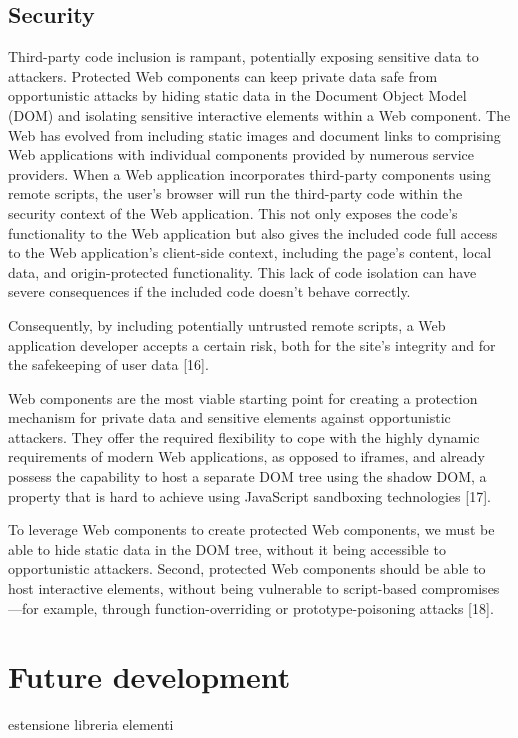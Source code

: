 \documentclass{sig-alternate}
\begin{document}
\subsection{Security}

Third-party code inclusion is rampant, potentially exposing sensitive data to attackers. Protected Web components can keep private data safe from opportunistic attacks by hiding static data in the Document Object Model (DOM) and isolating sensitive interactive elements within a Web component.
The Web has evolved from including static images and document links to comprising Web applications with individual components provided by numerous service providers. When a Web application incorporates third-party components using remote scripts, the user’s browser will run the third-party code within the security context of the Web application. This not only exposes the code’s functionality to the Web application but also gives the included code full access to the Web application’s client-side context, including the page’s content, local data, and origin-protected functionality. 
This lack of code isolation can have severe consequences if the included code doesn’t behave correctly.

Consequently, by including potentially untrusted remote scripts, a Web application developer accepts a certain risk, both for the site’s integrity and for the safekeeping of user data [16].

Web components are the most viable starting point for creating a protection mechanism for private data and sensitive elements against opportunistic attackers. They offer the required flexibility to cope with the highly dynamic requirements of modern Web applications, as opposed to iframes, and already possess the capability to host a separate DOM tree using the shadow DOM, a property that is hard to achieve using JavaScript sandboxing technologies [17].

To leverage Web components to create protected Web components, we must be able to hide static data in the DOM tree, without it being accessible to opportunistic attackers. Second, protected Web components should be able to host interactive elements, without being vulnerable to script-based compromises—for example, through function-overriding or prototype-poisoning attacks [18].


\section{Future development}

estensione libreria elementi




%

%
%
\end{document}
